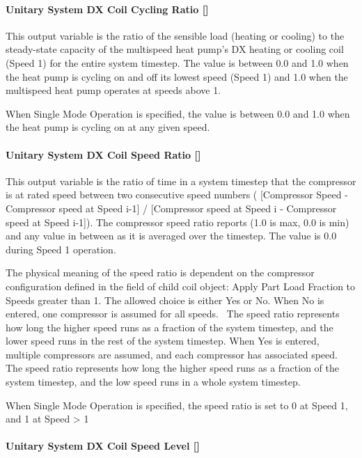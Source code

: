 \paragraph{Unitary System DX Coil Cycling Ratio {[]}}\label{unitary-system-dx-coil-cycling-ratio-1}

This output variable is the ratio of the sensible load (heating or cooling) to the steady-state capacity of the multispeed heat pump's DX heating or cooling coil (Speed 1) for the entire system timestep. The value is between 0.0 and 1.0 when the heat pump is cycling on and off its lowest speed (Speed 1) and 1.0 when the multispeed heat pump operates at speeds above 1.

When Single Mode Operation is specified, the value is between 0.0 and 1.0 when the heat pump is cycling on at any given speed.

\paragraph{Unitary System DX Coil Speed Ratio {[]}}\label{unitary-system-dx-coil-speed-ratio-1}

This output variable is the ratio of time in a system timestep that the compressor is at rated speed between two consecutive speed numbers ( {[}Compressor Speed - Compressor speed at Speed i-1{]} / {[}Compressor speed at Speed i - Compressor speed at Speed i-1{]}). The compressor speed ratio reports (1.0 is max, 0.0 is min) and any value in between as it is averaged over the timestep. The value is 0.0 during Speed 1 operation.

The physical meaning of the speed ratio is dependent on the compressor configuration defined in the field of child coil object: Apply Part Load Fraction to Speeds greater than 1. The allowed choice is either Yes or No. When No is entered, one compressor is assumed for all speeds. ~The speed ratio represents how long the higher speed runs as a fraction of the system timestep, and the lower speed runs in the rest of the system timestep. When Yes is entered, multiple compressors are assumed, and each compressor has associated speed. The speed ratio represents how long the higher speed runs as a fraction of the system timestep, and the low speed runs in a whole system timestep.

When Single Mode Operation is specified, the speed ratio is set to 0 at Speed 1, and 1 at Speed \textgreater{} 1

\paragraph{Unitary System DX Coil Speed Level {[]}}\label{unitary-system-dx-coil-speed-level-1}

